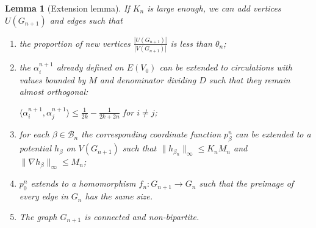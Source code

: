 \documentclass[10pt,a4paper]{amsart}
\newtheorem{lemma}{Lemma}
\begin{document}
\begin{lemma}[Extension lemma] \label{lemma:extension}
    If $K_n$ is large enough, we can add vertices $U(G_{n+1})$ and edges such that \begin{enumerate}
        \item \label{itm:proportion} the proportion of new vertices $\frac{|U(G_{n+1})|}{|V(G_{n+1})|}$ is less than $\theta_n$;
        
        \item \label{itm:circ} the $\alpha^{n+1}_i$ already defined on $E(V_0)$ can be extended to circulations with values bounded by $M$ and denominator dividing $D$ such that they remain almost orthogonal: 
        
        $\langle \alpha_i^{n+1}, \alpha_j^{n+1} \rangle \leq \frac{1}{2k}-\frac{1}{2k+2n}$ for $i \neq j$; 
        
        \item \label{itm:bounded_potential_gradient} for each $\beta \in \mathcal{B}_n$ the corresponding coordinate function $p^n_{\beta}$ can be extended to a potential $h_{\beta}$ on $V(G_{n+1})$ such that $\|h_{\beta_{n}}\|_{\infty}\leq K_n M_n$ and $\| \nabla h_{\beta} \|_{\infty} \leq M_n$;
        
        \item{$p_0^n$} \label{itm:proper} extends to a homomorphism $f_n: G_{n+1} \to G_n$ such that the preimage of every edge in $G_n$ has the same size.

        \item The graph $G_{n+1}$ is connected and non-bipartite.
    \end{enumerate}
\end{lemma}
\end{document}
